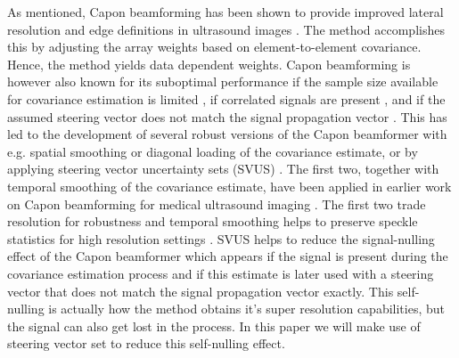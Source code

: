 \documentclass[journal]{IEEEtran}
\begin{document}
As mentioned, Capon beamforming has been shown to provide improved lateral resolution and edge definitions in ultrasound images \cite{Synnevag2007, Synnevag2009, Chen2011}. The method accomplishes this by adjusting the array weights based on element-to-element covariance. Hence, the method yields data dependent weights. Capon beamforming is however also known for its suboptimal performance if the sample size available for covariance estimation is limited \cite{Mestre2006}, if correlated signals are present \cite{Widrow1982}, and if the assumed steering vector does not match the signal propagation vector \cite{Wax1996, Wax1996a}. This has led to the development of several robust versions of the Capon beamformer with e.g. spatial smoothing \cite{Shan1985} or diagonal loading \cite{JianLi2003} of the covariance estimate, or by applying steering vector uncertainty sets (SVUS) \cite{Lorenz2005, Rubsamen2013}. The first two, together with temporal smoothing of the covariance estimate, have been applied in earlier work on Capon beamforming for medical ultrasound imaging \cite{Synnevag2009}. The first two trade resolution for robustness and temporal smoothing helps to preserve speckle statistics for high resolution settings \cite{Synnevag2007a}. SVUS helps to reduce the signal-nulling effect of the Capon beamformer which appears if the signal is present during the covariance estimation process and if this estimate is later used with a steering vector that does not match the signal propagation vector exactly. This self-nulling is actually how the method obtains it's super resolution capabilities, but the signal can also get lost in the process. In this paper we will make use of steering vector set to reduce this self-nulling effect.
\end{document}
